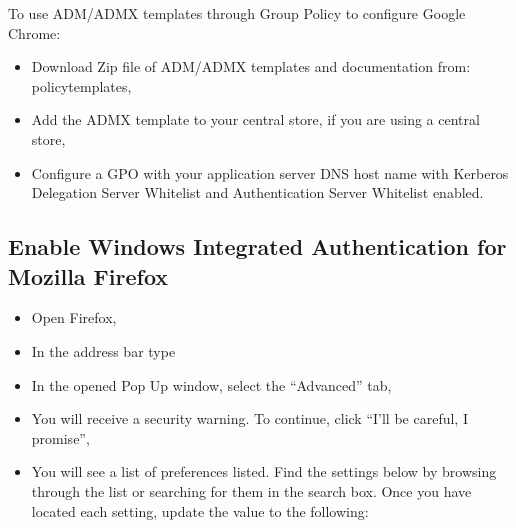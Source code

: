 \documentclass[letterpaper,10pt,english]{sphinxmanual}
\begin{document}
\sphinxAtStartPar
To use ADM/ADMX templates through Group Policy to configure Google Chrome:
\begin{itemize}
\item {} 
\sphinxAtStartPar
Download Zip file of ADM/ADMX templates and documentation from:  policy\sphinxhyphen{}templates,

\item {} 
\sphinxAtStartPar
Add the ADMX template to your central store, if you are using a central store,

\item {} 
\sphinxAtStartPar
Configure a GPO with your application server DNS host name with Kerberos Delegation Server Whitelist and Authentication Server Whitelist enabled.

\end{itemize}


\subsection{Enable Windows Integrated Authentication for Mozilla Firefox}
\label{\detokenize{Customization:enable-windows-integrated-authentication-for-mozilla-firefox}}\begin{itemize}
\item {} 
\sphinxAtStartPar
Open Firefox,

\item {} 
\sphinxAtStartPar
In the address bar type 

\item {} 
\sphinxAtStartPar
In the opened Pop Up window, select the “Advanced” tab,

\item {} 
\sphinxAtStartPar
You will receive a security warning. To continue, click “I’ll be careful, I promise”,

\item {} 
\sphinxAtStartPar
You will see a list of preferences listed. Find the settings below by browsing through the list or searching for them in the search box. Once you have located each setting, update the value to the following:

\end{itemize}

\begin{sphinxVerbatim}[commandchars=\\\{\}]
 

     

     

     
\end{sphinxVerbatim}
\end{document}

